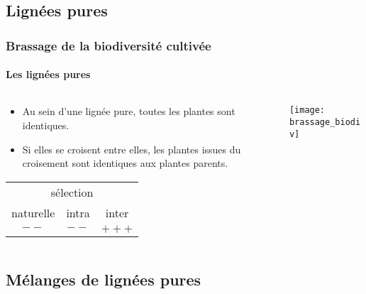 \subsection{Lignées pures}

\begin{frame}
\frametitle{Brassage de la biodiversité cultivée}
\framesubtitle{Les lignées pures}


\begin{columns}
\begin{column}{.5\textwidth}

\begin{itemize}
\item Au sein d'une lignée pure, toutes les plantes sont identiques.
\item Si elles se croisent entre elles, les plantes issues du croisement sont identiques aux plantes parents.
\end{itemize}

\begin{center}
\begin{tabular}{ccc}
\hline
\multicolumn{3}{c}{sélection} \\
naturelle & intra & inter \\
\hline
$--$ & $--$ & $+++$ \\
\hline
\end{tabular}
\end{center}

\end{column}

\begin{column}{.5\textwidth}
\texttt{[image: brassage\_biodiv]}
\end{column}
\end{columns}


\end{frame}


\subsection{Mélanges de lignées pures}

